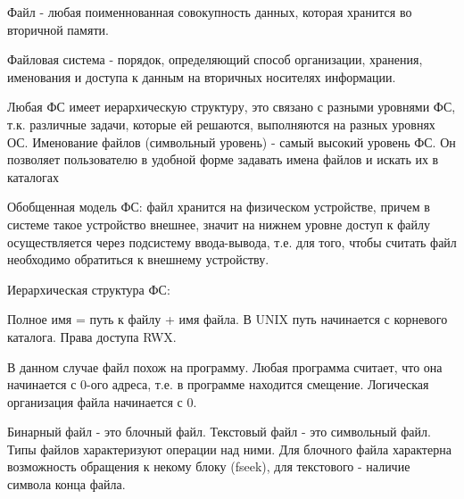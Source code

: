 \documentclass[12pt,a4paper]{scrreprt}
\begin{document}
Файл - любая поименнованная совокупность данных, которая хранится во вторичной памяти.

Файловая система - порядок, определяющий способ организации, хранения, именования и доступа к данным на вторичных носителях информации.

Любая ФС имеет иерархическую структуру, это связано с разными уровнями ФС, т.к. различные задачи, которые ей решаются, выполняются на разных уровнях ОС. Именование файлов (символьный уровень) - самый высокий уровень ФС. Он позволяет пользователю в удобной форме задавать имена файлов и искать их в каталогах

Обобщенная модель ФС: файл хранится на физическом устройстве, причем в системе такое устройство внешнее, значит на нижнем уровне доступ к файлу осуществляется через подсистему ввода-вывода, т.е. для того, чтобы считать файл необходимо обратиться к внешнему устройству.

Иерархическая структура ФС:

\begin{figure}[!h]
\end{figure}

Полное имя = путь к файлу + имя файла. В UNIX путь начинается с корневого каталога. Права доступа RWX. 

В данном случае файл похож на программу. Любая программа считает, что она начинается с 0-ого адреса, т.е. в программе находится смещение. Логическая организация файла начинается с 0.

Бинарный файл - это блочный файл. Текстовый файл - это символьный файл. Типы файлов характеризуют операции над ними. Для блочного файла характерна возможность обращения к некому блоку (fseek), для текстового - наличие символа конца файла.
\end{document}
